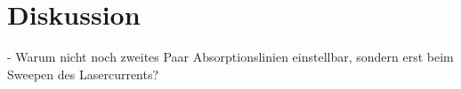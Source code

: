 \section{Diskussion}
\label{sec:Diskussion}

- Warum nicht noch zweites Paar Absorptionslinien einstellbar, sondern erst beim Sweepen des Lasercurrents?
